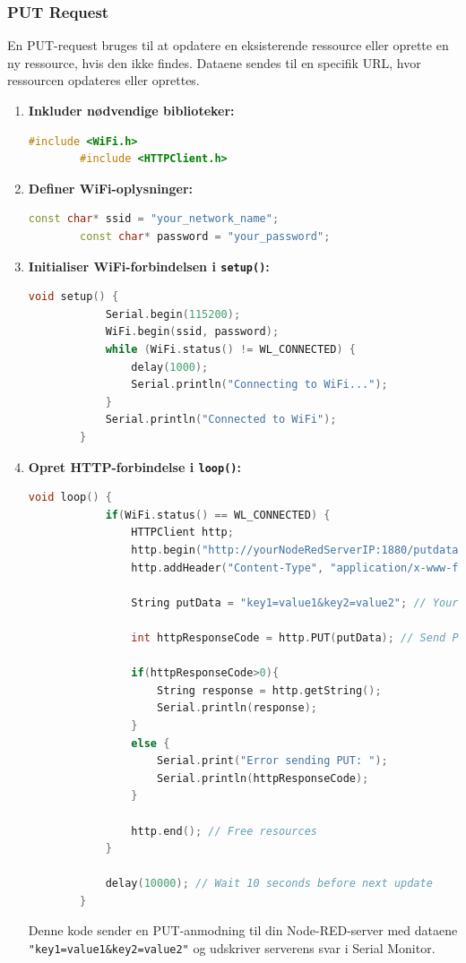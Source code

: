 \subsubsection*{PUT Request}
En PUT-request bruges til at opdatere en eksisterende ressource eller oprette en ny ressource, hvis den ikke findes. Dataene sendes til en specifik URL, hvor ressourcen opdateres eller oprettes.

\begin{enumerate}
	\item \textbf{Inkluder nødvendige biblioteker:}
	\begin{lstlisting}[language=C++, caption=Include necessary libraries]
		#include <WiFi.h>
		#include <HTTPClient.h>
	\end{lstlisting}
	
	\item \textbf{Definer WiFi-oplysninger:}
	\begin{lstlisting}[language=C++, caption=Define WiFi credentials]
		const char* ssid = "your_network_name";
		const char* password = "your_password";
	\end{lstlisting}
	
	\item \textbf{Initialiser WiFi-forbindelsen i \texttt{setup()}:}
	\begin{lstlisting}[language=C++, caption=Initialize WiFi connection in setup()]
		void setup() {
			Serial.begin(115200);
			WiFi.begin(ssid, password);
			while (WiFi.status() != WL_CONNECTED) {
				delay(1000);
				Serial.println("Connecting to WiFi...");
			}
			Serial.println("Connected to WiFi");
		}
	\end{lstlisting}
	
	\item \textbf{Opret HTTP-forbindelse i \texttt{loop()}:}
	\begin{lstlisting}[language=C++, caption=Create HTTP connection in loop()]
		void loop() {
			if(WiFi.status() == WL_CONNECTED) {
				HTTPClient http;
				http.begin("http://yourNodeRedServerIP:1880/putdata"); // Specify the URL
				http.addHeader("Content-Type", "application/x-www-form-urlencoded"); // Set content type
				
				String putData = "key1=value1&key2=value2"; // Your PUT data
				
				int httpResponseCode = http.PUT(putData); // Send PUT request
				
				if(httpResponseCode>0){
					String response = http.getString();
					Serial.println(response);
				}
				else {
					Serial.print("Error sending PUT: ");
					Serial.println(httpResponseCode);
				}
				
				http.end(); // Free resources
			}
			
			delay(10000); // Wait 10 seconds before next update
		}
	\end{lstlisting}
	Denne kode sender en PUT-anmodning til din Node-RED-server med dataene \texttt{"key1=value1\&key2=value2"} og udskriver serverens svar i Serial Monitor.
\end{enumerate}

